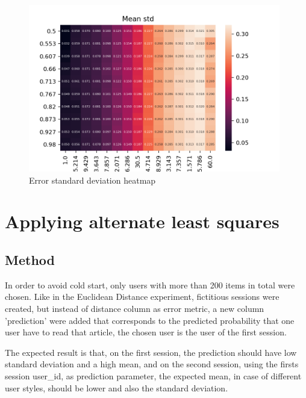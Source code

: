 \documentclass[ecp,tc,english]{iiufrgs}
\begin{document}
        \begin{figure}[H]
            \centering
            \includegraphics[width=0.98\textwidth]{images/error_std.png}
            \caption{Error standard deviation heatmap}
            \label{fig:error_std_heatmap}
        \end{figure}
    
    \section{Applying alternate least squares}
        \subsection{Method}
        In order to avoid cold start, only users with more than 200 items in total were chosen.
        Like in the Euclidean Distance experiment, fictitious sessions were created, but instead of distance column as error metric, a new column 'prediction' were added that corresponds to the predicted probability that one user have to read that article, the chosen user is the user of the first session.
        

        The expected result is that, on the first session, the prediction should have low standard deviation and a high mean, and on the second session, using the firsts session user\_id, as prediction parameter, the expected mean, in case of different user styles, should be lower and also the standard deviation.
        
        \newpage 
        
\end{document}
